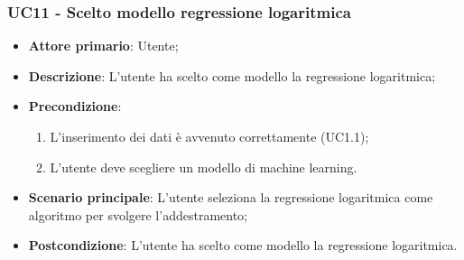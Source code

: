 \subsubsection{UC11 - Scelto modello regressione logaritmica}
\label{sssec:uc11}
\begin{itemize}
  \item \textbf{Attore primario}: Utente;
  \item \textbf{Descrizione}: L'utente ha scelto come modello la regressione logaritmica;
  \item \textbf{Precondizione}:
  \begin{enumerate}
    \item L'inserimento dei dati è avvenuto correttamente (UC1.1);
    \item L'utente deve scegliere un modello di machine learning.
  \end{enumerate}
  \item \textbf{Scenario principale}: L'utente seleziona la regressione logaritmica come algoritmo per svolgere l'addestramento;
  \item \textbf{Postcondizione}: L'utente ha scelto come modello la regressione logaritmica.
\end{itemize}
